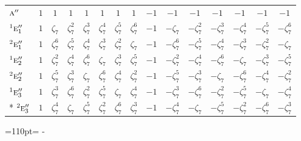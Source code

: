 \documentclass[10pt,a4paper]{article}
\newcommand{\needspace}[1]{\par\penalty-100\begingroup\dimen0=#1\relax\dimen2=\pagegoal
  \advance\dimen2-\pagetotal\ifdim\dimen0>\dimen2\relax\ifdim\dimen2>0pt\vfil\break\fi\fi
  \endgroup}
\numberwithin{equation}{section}
\newcommand{\irr}[1]{\text{\normalfont\scshape #1}}
\newcommand{\conjpair}[1]{{}^{#1}}
\newcommand{\rootunity}[1]{\zeta_{#1}}
\begin{document}
{\begin{longtable}{@{}lcccccccccccccc@{}}
$\irr{a}''$ & $1$ & $1$ & $1$ & $1$ & $1$ & $1$ & $1$ & $-1$ & $-1$ & $-1$ & $-1$ & $-1$ & $-1$ & $-1$\\
$\conjpair{1}\irr{e}_{1}''$ & $1$ & $\rootunity{7}$ & $\rootunity{7}^{2}$ & $\rootunity{7}^{3}$ & $\rootunity{7}^{4}$ & $\rootunity{7}^{5}$ & $\rootunity{7}^{6}$ & $-1$ & $-\rootunity{7}$ & $-\rootunity{7}^{2}$ & $-\rootunity{7}^{3}$ & $-\rootunity{7}^{4}$ & $-\rootunity{7}^{5}$ & $-\rootunity{7}^{6}$\\
$\conjpair{2}\irr{e}_{1}''$ & $1$ & $\rootunity{7}^{6}$ & $\rootunity{7}^{5}$ & $\rootunity{7}^{4}$ & $\rootunity{7}^{3}$ & $\rootunity{7}^{2}$ & $\rootunity{7}$ & $-1$ & $-\rootunity{7}^{6}$ & $-\rootunity{7}^{5}$ & $-\rootunity{7}^{4}$ & $-\rootunity{7}^{3}$ & $-\rootunity{7}^{2}$ & $-\rootunity{7}$\\
$\conjpair{1}\irr{e}_{2}''$ & $1$ & $\rootunity{7}^{2}$ & $\rootunity{7}^{4}$ & $\rootunity{7}^{6}$ & $\rootunity{7}$ & $\rootunity{7}^{3}$ & $\rootunity{7}^{5}$ & $-1$ & $-\rootunity{7}^{2}$ & $-\rootunity{7}^{4}$ & $-\rootunity{7}^{6}$ & $-\rootunity{7}$ & $-\rootunity{7}^{3}$ & $-\rootunity{7}^{5}$\\
$\conjpair{2}\irr{e}_{2}''$ & $1$ & $\rootunity{7}^{5}$ & $\rootunity{7}^{3}$ & $\rootunity{7}$ & $\rootunity{7}^{6}$ & $\rootunity{7}^{4}$ & $\rootunity{7}^{2}$ & $-1$ & $-\rootunity{7}^{5}$ & $-\rootunity{7}^{3}$ & $-\rootunity{7}$ & $-\rootunity{7}^{6}$ & $-\rootunity{7}^{4}$ & $-\rootunity{7}^{2}$\\
$\conjpair{1}\irr{e}_{3}''$ & $1$ & $\rootunity{7}^{3}$ & $\rootunity{7}^{6}$ & $\rootunity{7}^{2}$ & $\rootunity{7}^{5}$ & $\rootunity{7}$ & $\rootunity{7}^{4}$ & $-1$ & $-\rootunity{7}^{3}$ & $-\rootunity{7}^{6}$ & $-\rootunity{7}^{2}$ & $-\rootunity{7}^{5}$ & $-\rootunity{7}$ & $-\rootunity{7}^{4}$\\*
$\conjpair{2}\irr{e}_{3}''$ & $1$ & $\rootunity{7}^{4}$ & $\rootunity{7}$ & $\rootunity{7}^{5}$ & $\rootunity{7}^{2}$ & $\rootunity{7}^{6}$ & $\rootunity{7}^{3}$ & $-1$ & $-\rootunity{7}^{4}$ & $-\rootunity{7}$ & $-\rootunity{7}^{5}$ & $-\rootunity{7}^{2}$ & $-\rootunity{7}^{6}$ & $-\rootunity{7}^{3}$\\
\bottomrule\end{longtable}}
\needspace{110pt}
\end{document}
